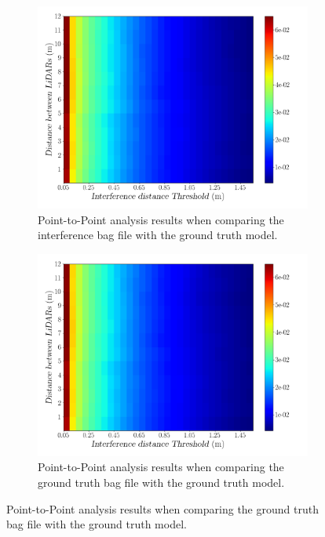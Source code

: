 \begin{figure}[!ht]
\centering
\begin{subfigure}[c]{0.45\textwidth}
	\includegraphics[width=\textwidth]{img/lidar-interference/distance/interference_distance_color_mesh.png}
	\caption{Point-to-Point analysis results when comparing the interference bag file with the ground truth model.}
	\label{fig:distance:interference-color-mesh}
\end{subfigure}
\qquad
\begin{subfigure}[c]{0.45\textwidth}
	\includegraphics[width=\textwidth]{img/lidar-interference/distance/ground_truth_distance_color_mesh.png}
	\caption{Point-to-Point analysis results when comparing the ground truth bag file with the ground truth model.}

\end{subfigure}
\end{figure}
